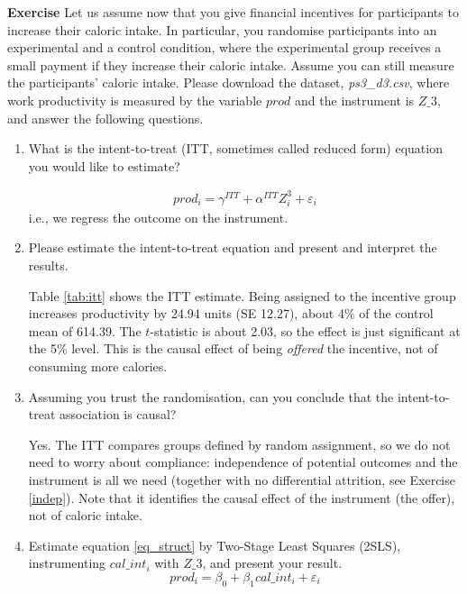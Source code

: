 \documentclass[10pt]{article}
\newcounter{exercise}
\newenvironment{exercise}%
{%
	\refstepcounter{exercise}%
	\textbf{Exercise \theexercise}%
	}%
{
 \par\vspace{\baselineskip}%
\noindent\ignorespacesafterend
}
\begin{document}
\begin{exercise}\label{2sls}
	Let us assume now that you give financial incentives for participants to increase their caloric intake. In particular, you randomise participants into an experimental and a control condition, where the experimental group receives a small payment if they increase their caloric intake. Assume you can still measure the participants' caloric intake. Please download the dataset, \textit{ps3\_d3.csv}, where work productivity is measured by the variable $ prod $ and the instrument is $ Z\_3 $, and answer the following questions.
	\begin{enumerate}
		\item What is the intent-to-treat (ITT, sometimes called reduced form) equation you would like to estimate?

		\color{red}
		\begin{align}\label{itt3}
		prod_{i} = \gamma^{ITT} + \alpha^{ITT} Z^{3}_i + \varepsilon_{i}
		\end{align}
		i.e., we regress the outcome on the instrument.
		\color{black}
		\item Please estimate the intent-to-treat equation and present and interpret the results.

		\color{red}
		Table \ref{tab:itt} shows the ITT estimate. Being assigned to the incentive group increases productivity by 24.94 units (SE 12.27), about 4\% of the control mean of 614.39. The $t$-statistic is about 2.03, so the effect is just significant at the 5\% level. This is the causal effect of being \textit{offered} the incentive, not of consuming more calories.

		
		\color{black}
		\item Assuming you trust the randomisation, can you conclude that the intent-to-treat association is causal?

		\color{red}
		Yes. The ITT compares groups defined by random assignment, so we do not need to worry about compliance: independence of potential outcomes and the instrument is all we need (together with no differential attrition, see Exercise \ref{indep}). Note that it identifies the causal effect of the instrument (the offer), not of caloric intake.
		\color{black}
		\item Estimate equation \ref{eq_struct} by Two-Stage Least Squares (2SLS), instrumenting $ cal\_int_{i} $ with $ Z\_3 $, and present your result.
		\begin{equation}\label{eq_struct}
			prod_{i} = \beta_{0} + \beta_{1} cal\_int_{i} + \varepsilon_{i}
		\end{equation}


\end{enumerate}
\end{exercise}
\end{document}
